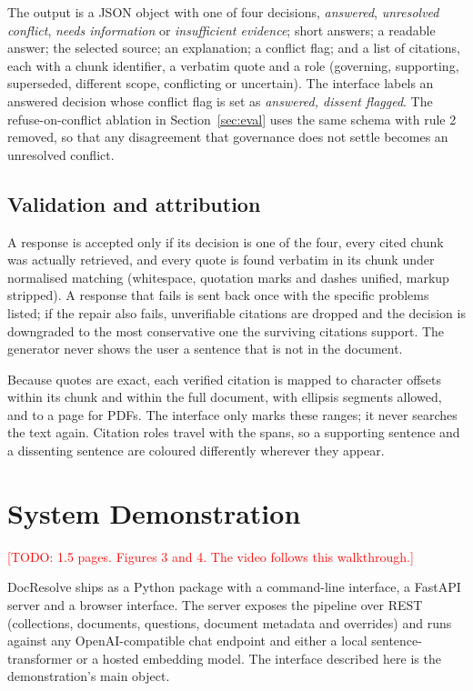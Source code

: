 \documentclass[11pt]{article}
\newcommand{\sysname}{DocResolve}   %
\newcommand{\todo}[1]{\textcolor{red}{[TODO: #1]}}
\begin{document}
The output is a JSON object with one of four decisions, \emph{answered},
\emph{unresolved conflict}, \emph{needs information} or \emph{insufficient
evidence}; short answers; a readable answer; the selected source; an
explanation; a conflict flag; and a list of citations, each with a chunk
identifier, a verbatim quote and a role (governing, supporting,
superseded, different scope, conflicting or uncertain). The interface
labels an answered decision whose conflict flag is set as \emph{answered,
dissent flagged}. The refuse-on-conflict ablation in Section~\ref{sec:eval}
uses the same schema with rule 2 removed, so that any disagreement that
governance does not settle becomes an unresolved conflict.

\subsection{Validation and attribution}
A response is accepted only if its decision is one of the four, every cited
chunk was actually retrieved, and every quote is found verbatim in its
chunk under normalised matching (whitespace, quotation marks and dashes
unified, markup stripped). A response that fails is sent back once with the
specific problems listed; if the repair also fails, unverifiable citations
are dropped and the decision is downgraded to the most conservative one the
surviving citations support. The generator never shows the user a sentence
that is not in the document.

Because quotes are exact, each verified citation is mapped to character
offsets within its chunk and within the full document, with ellipsis
segments allowed, and to a page for PDFs. The interface only marks these
ranges; it never searches the text again. Citation roles travel with the
spans, so a supporting sentence and a dissenting sentence are coloured
differently wherever they appear.

\section{System Demonstration}
\todo{1.5 pages. Figures 3 and 4. The video follows this walkthrough.}

\sysname{} ships as a Python package with a command-line interface, a FastAPI
server and a browser interface. The server exposes the pipeline over REST
(collections, documents, questions, document metadata and overrides) and
runs against any OpenAI-compatible chat endpoint and either a local
sentence-transformer or a hosted embedding model. The interface described
here is the demonstration's main object.
\end{document}
